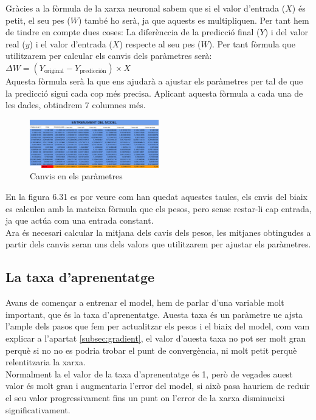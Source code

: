 Gràcies a la fòrmula de la xarxa neuronal sabem que si el valor d'entrada ($X$) és petit, el seu pes ($W$) també ho serà, ja que aquests es multipliquen. Per tant hem de tindre en compte dues coses: La diferènccia de la predicció final ($Y$) i del valor real ($y$) i el valor d'entrada ($X$) respecte al seu pes ($W$). Per tant fòrmula que utilitzarem per calcular els canvis dels paràmetres serà:\\
$\Delta W = (Y_{\text{original}} - Y_{\text{predicción}}) \times X$\\
Aquesta fòrmula serà la que ens ajudarà a ajustar els paràmetres per tal de que la predicció sigui cada cop més precisa. Aplicant aquesta fòrmula a cada una de les dades, obtindrem 7 columnes més.

\begin{figure}[H]
    \centering
    \includegraphics[width=0.5\textwidth]{./figures/Canvis.png}
    \caption{Canvis en els paràmetres}
\end{figure}

En la figura 6.31 es por veure com han quedat aquestes taules, els cnvis del biaix es calculen amb la mateixa fòrmula que els pesos, pero sense restar-li cap entrada, ja que actúa com una entrada constant.\\

Ara és necesari calcular la mitjana dels cavis dels pesos, les mitjanes obtingudes a partir dels canvis seran uns dels valors que utilitzarem per ajustar els paràmetres.

\subsection{La taxa d'aprenentatge}
Avans de començar a entrenar el model, hem de parlar d'una variable molt important, que és la taxa d'aprenentatge. Auesta taxa és un paràmetre ue ajsta l'ample dels pasos que fem per actualitzar els pesos i el biaix del model, com vam explicar a l'apartat \ref{subsec:gradient}, el valor d'auesta taxa no pot ser molt gran perquè si no no es podria trobar el punt de convergència, ni molt petit perquè relentitzaria la xarxa.\\

Normalment la el valor de la taxa d'aprenentatge és 1, però de vegades auest valor és molt gran i augmentaria l'error del model, si això pasa hauriem de reduir el seu valor progressivament fins un punt on l'error de la xarxa disminueixi significativament.\\

